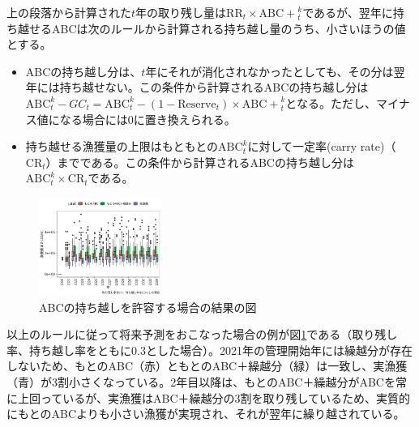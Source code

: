 \documentclass[11pt]{jsarticle}
\begin{document}
上の段落から計算された$t$年の取り残し量は$\mathrm{RR}_t \times \mathrm{ABC+}_{t}^{k}$であるが、翌年に持ち越せるABCは次のルールから計算される持ち越し量のうち、小さいほうの値とする。
\begin{itemize}
\item ABCの持ち越し分は、$t$年にそれが消化されなかったとしても、その分は翌年には持ち越せない。この条件から計算されるABCの持ち越し分は $\mathrm{ABC}_t^k-GC_{t} = \mathrm{ABC}_t^k-(1-\mathrm{Reserve}_t) \times \mathrm{ABC+}_{t}^{k}$となる。ただし、マイナス値になる場合には0に置き換えられる。
\item 持ち越せる漁獲量の上限はもともとの$\mathrm{ABC}_t^k$に対して一定率(carry rate)（$\mathrm{CR}_t$）までである。この条件から計算されるABCの持ち越し分は$\mathrm{ABC}_t^k \times \mathrm{CR}_t$である。
\end{itemize}

\begin{figure}[b]
  \includegraphics[width=4cm]{TAC_carry_over.jpg}  
  \caption{
    ABCの持ち越しを許容する場合の結果の図
  }
  \label{fig_carry_over}
\end{figure}

\newpage

以上のルールに従って将来予測をおこなった場合の例が図\ref{fig_carry_over}である（取り残し率、持ち越し率をともに0.3とした場合）。2021年の管理開始年には繰越分が存在しないため、もとのABC（赤）ともとのABC＋繰越分（緑）は一致し、実漁獲（青）が3割小さくなっている。2年目以降は、もとのABC＋繰越分がABCを常に上回っているが、実漁獲はABC＋繰越分の3割を取り残しているため、実質的にもとのABCよりも小さい漁獲が実現され、それが翌年に繰り越されている。
\end{document}
